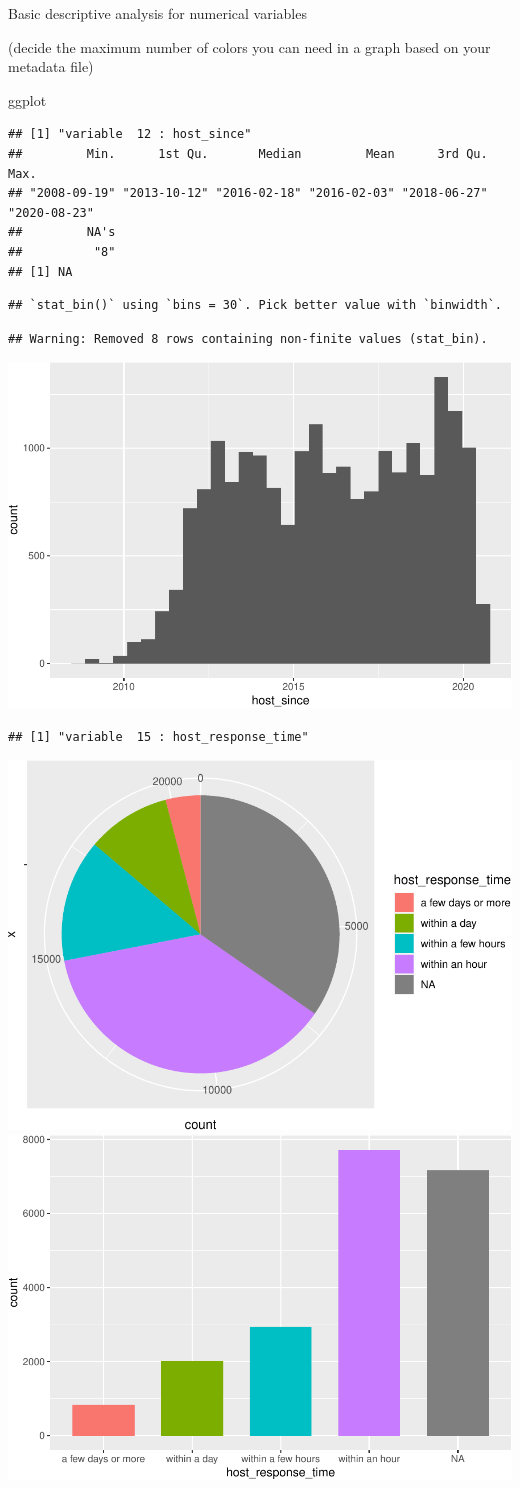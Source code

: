 Basic descriptive analysis for numerical variables

(decide the maximum number of colors you can need in a graph based on
your metadata file)

ggplot

\begin{verbatim}
## [1] "variable  12 : host_since"
##         Min.      1st Qu.       Median         Mean      3rd Qu.         Max. 
## "2008-09-19" "2013-10-12" "2016-02-18" "2016-02-03" "2018-06-27" "2020-08-23" 
##         NA's 
##          "8" 
## [1] NA
\end{verbatim}

\begin{verbatim}
## `stat_bin()` using `bins = 30`. Pick better value with `binwidth`.
\end{verbatim}

\begin{verbatim}
## Warning: Removed 8 rows containing non-finite values (stat_bin).
\end{verbatim}

\includegraphics[width=0.5\linewidth]{anal_files/figure-latex/figures-side-1}

\begin{verbatim}
## [1] "variable  15 : host_response_time"
\end{verbatim}

\includegraphics[width=0.5\linewidth]{anal_files/figure-latex/figures-side-2}
\includegraphics[width=0.5\linewidth]{anal_files/figure-latex/figures-side-3}

